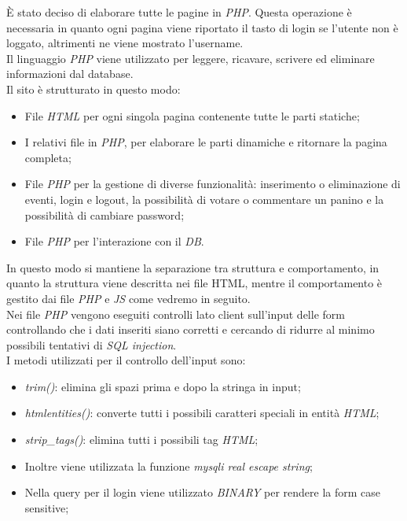 È stato deciso di elaborare tutte le pagine in \emph{PHP}. Questa operazione è necessaria in quanto ogni 
pagina viene riportato il tasto di login se l'utente non è loggato, altrimenti ne viene mostrato l'username.\\
Il linguaggio \emph{PHP} viene utilizzato per leggere, ricavare, scrivere ed eliminare informazioni dal database.\\
Il sito è strutturato in questo modo: 
\begin{itemize}
    \item File \emph{HTML} per ogni singola pagina contenente tutte le parti statiche;
    \item I relativi file in \emph{PHP}, per elaborare le parti dinamiche e ritornare la pagina completa;
    \item File \emph{PHP} per la gestione di diverse funzionalità: inserimento o eliminazione di eventi, login e logout, la possibilità di votare o commentare un panino e la possibilità di cambiare password;
    \item File \emph{PHP} per l'interazione con il \emph{DB}.
\end{itemize}
In questo modo si mantiene la separazione tra struttura e comportamento, in quanto la struttura viene descritta nei file HTML, mentre il comportamento è gestito dai file \emph{PHP} e \emph{JS} come vedremo in seguito.\\

Nei file \emph{PHP} vengono eseguiti controlli lato client sull'input delle form controllando che i dati inseriti siano corretti e cercando di ridurre al minimo possibili tentativi di \emph{SQL injection}.\\
I metodi utilizzati per il controllo dell'input sono: 
    \begin{itemize}
        \item \emph{trim()}: elimina gli spazi prima e dopo la stringa in input;
        \item \emph{htmlentities()}: converte tutti i possibili caratteri speciali in entità \emph{HTML};
        \item \emph{strip\_tags()}: elimina tutti i possibili tag \emph{HTML};
        \item Inoltre viene utilizzata la funzione \emph{mysqli real escape string};
        \item Nella query per il login viene utilizzato \emph{BINARY} per rendere la form case sensitive;
    \end{itemize}